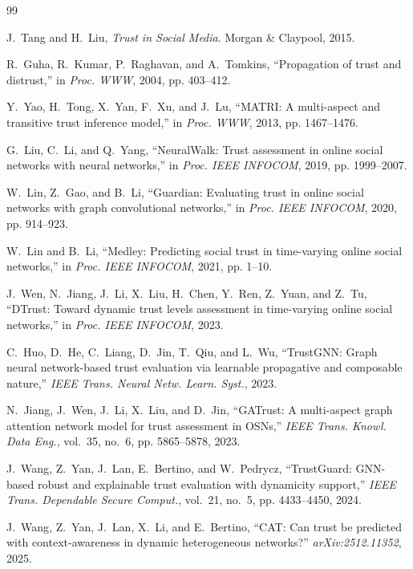 \documentclass[conference]{IEEEtran}
\begin{document}

\begin{thebibliography}{99}

J.~Tang and H.~Liu, \emph{Trust in Social Media}. Morgan \& Claypool, 2015.

R.~Guha, R.~Kumar, P.~Raghavan, and A.~Tomkins, ``Propagation of trust and distrust,'' in \emph{Proc. WWW}, 2004, pp. 403--412.

Y.~Yao, H.~Tong, X.~Yan, F.~Xu, and J.~Lu, ``MATRI: A multi-aspect and transitive trust inference model,'' in \emph{Proc. WWW}, 2013, pp. 1467--1476.

G.~Liu, C.~Li, and Q.~Yang, ``NeuralWalk: Trust assessment in online social networks with neural networks,'' in \emph{Proc. IEEE INFOCOM}, 2019, pp. 1999--2007.

W.~Lin, Z.~Gao, and B.~Li, ``Guardian: Evaluating trust in online social networks with graph convolutional networks,'' in \emph{Proc. IEEE INFOCOM}, 2020, pp. 914--923.

W.~Lin and B.~Li, ``Medley: Predicting social trust in time-varying online social networks,'' in \emph{Proc. IEEE INFOCOM}, 2021, pp. 1--10.

J.~Wen, N.~Jiang, J.~Li, X.~Liu, H.~Chen, Y.~Ren, Z.~Yuan, and Z.~Tu, ``DTrust: Toward dynamic trust levels assessment in time-varying online social networks,'' in \emph{Proc. IEEE INFOCOM}, 2023.

C.~Huo, D.~He, C.~Liang, D.~Jin, T.~Qiu, and L.~Wu, ``TrustGNN: Graph neural network-based trust evaluation via learnable propagative and composable nature,'' \emph{IEEE Trans. Neural Netw. Learn. Syst.}, 2023.

N.~Jiang, J.~Wen, J.~Li, X.~Liu, and D.~Jin, ``GATrust: A multi-aspect graph attention network model for trust assessment in OSNs,'' \emph{IEEE Trans. Knowl. Data Eng.}, vol.~35, no.~6, pp. 5865--5878, 2023.

J.~Wang, Z.~Yan, J.~Lan, E.~Bertino, and W.~Pedrycz, ``TrustGuard: GNN-based robust and explainable trust evaluation with dynamicity support,'' \emph{IEEE Trans. Dependable Secure Comput.}, vol.~21, no.~5, pp. 4433--4450, 2024.

J.~Wang, Z.~Yan, J.~Lan, X.~Li, and E.~Bertino, ``CAT: Can trust be predicted with context-awareness in dynamic heterogeneous networks?'' \emph{arXiv:2512.11352}, 2025.


\end{thebibliography}
\end{document}
